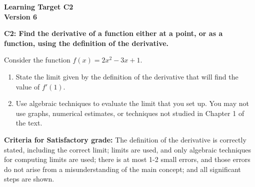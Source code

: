 \documentclass[10pt]{article}
\begin{document}
	\vspace*{0in}

		\begin{center}
			\textbf{Learning Target C2 \\
			Version 6} \\
		\end{center}


\begin{framed}
	\textbf{C2: Find the derivative of a function either at a point, or as a function, using the definition of the derivative.
}
\end{framed}

Consider the function $f(x) = 2x^2 - 3x + 1$. 

\begin{enumerate}
    \item State the limit given by the definition of the derivative that will find the value of $f'(1).$
    
    \vspace{1in} 
    
    
    \item Use algebraic techniques to evaluate the limit that you set up. You may not use graphs, numerical estimates, or techniques not studied in Chapter 1 of the text. 
\end{enumerate}



\vfill


\begin{small}
    \begin{framed}
        	\textbf{Criteria for Satisfactory grade:} The definition of the derivative is correctly stated, including the correct limit; limits are used, and only algebraic techniques for computing limits are used; there is at most 1-2 small errors, and those errors do not arise from a misunderstanding of the main concept; and all significant steps are shown. 
    \end{framed}

\end{small}
\end{document}
